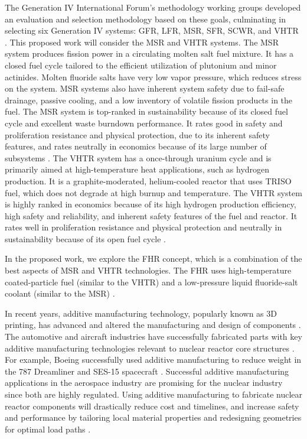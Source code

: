 The Generation IV International Forum's methodology working groups developed 
an evaluation and selection methodology based on these goals, 
culminating in selecting six Generation IV systems: \gls{GFR}, 
\gls{LFR}, \gls{MSR}, \gls{SFR}, \gls{SCWR}, and \gls{VHTR} 
\cite{gif_technology_2002}. 
This proposed work will consider the \gls{MSR} and \gls{VHTR} systems. 
The MSR system produces fission power in a circulating molten salt fuel mixture. 
It has a closed fuel cycle tailored to the efficient utilization of plutonium 
and minor actinides. 
Molten fluoride salts have very low vapor pressure, which reduces stress on the 
system. 
MSR systems also have inherent system safety due to fail-safe drainage, 
passive cooling, and a low inventory of volatile fission products in the fuel. 
The MSR system is top-ranked in sustainability because of its closed fuel cycle 
and excellent waste burndown performance. 
It rates good in safety and proliferation resistance and physical protection, 
due to its inherent safety features, and rates neutrally in economics because of
its large number of subsystems \cite{gif_technology_2002}.  
The \gls{VHTR} system has a once-through uranium cycle and is primarily aimed at 
high-temperature heat applications, such as hydrogen production. 
It is a graphite-moderated, helium-cooled reactor that uses \gls{TRISO} fuel, 
which does not degrade at high burnup and temperature.  
The \gls{VHTR} system is highly ranked in economics because of its high hydrogen 
production efficiency, high safety and reliability, and inherent safety features 
of the fuel and reactor. 
It rates well in proliferation resistance and physical protection and 
neutrally in sustainability because of its open fuel cycle \cite{gif_technology_2002}. 

In the proposed work, we explore the \gls{FHR} concept, which 
is a combination of the best aspects of \gls{MSR} and \gls{VHTR} technologies. 
The \gls{FHR} uses high-temperature coated-particle fuel (similar to the \gls{VHTR}) 
and a low-pressure liquid fluoride-salt coolant (similar to the \gls{MSR})
\cite{forsberg_fluoride-salt-cooled_2012,facilitators_fluoride-salt-cooled_2013}.

In recent years, additive manufacturing technology, popularly known as 3D printing, 
has advanced and altered the manufacturing and design of components 
\cite{simpson_considerations_2019}. 
The automotive and aircraft industries have successfully fabricated parts with 
key additive manufacturing technologies relevant to nuclear reactor core 
structures \cite{murr_frontiers_2016}.  
For example, Boeing successfully used additive manufacturing to reduce weight 
in the 787 Dreamliner \cite{noauthor_printed_2017} and SES-15 spacecraft 
\cite{noauthor_boeing_nodate}. 
Successful additive manufacturing applications in the aerospace industry are 
promising for the nuclear industry since both are highly regulated. 
Using additive manufacturing to fabricate nuclear reactor components will 
drastically reduce cost and timelines, and increase safety and performance by 
tailoring local material properties and redesigning geometries for optimal load paths 
\cite{simpson_considerations_2019}. 

